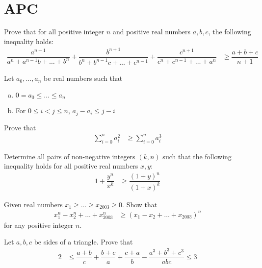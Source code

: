 \documentclass{subfile}
\begin{document}
	\section{APC}\label{sec:apc}
	
		\begin{problem}
			Prove that for all positive integer $n$ and positive real numbers $a,b,c$, the following inequality holds:
				\begin{align*}
					\dfrac{a^{n+1}}{a^{n}+a^{n-1}b+\ldots+b^{n}}+\dfrac{b^{n+1}}{b^{n}+b^{n-1}c+\ldots+c^{n-1}}+\dfrac{c^{n+1}}{c^{n}+c^{n-1}+\ldots+a^{n}}
						& \geq\dfrac{a+b+c}{n+1}
				\end{align*}
		\end{problem}
		
		\begin{problem}
			Let $a_{0},\ldots,a_{n}$ be real numbers such that
				\begin{enumerate}[(a)]
					\item $0= a_{0}\leq\ldots\leq a_{n}$
					\item For $0\leq i<j\leq n$, $a_{j}-a_{i}\leq j-i$
				\end{enumerate}
			Prove that
				\begin{align*}
					\sum_{i=0}^{n}a_{i}^{2}
						& \geq\sum_{i=0}^{n}a_{i}^{3}
				\end{align*}
		\end{problem}
		
		\begin{problem}%
			Determine all pairs of non-negative integers $(k,n)$ such that the following inequality holds for all positive real numbers $x,y$:
				\begin{align*}
					1+\dfrac{y^{n}}{x^{k}}
						& \geq\dfrac{(1+y)^{n}}{(1+x)^{k}}
				\end{align*}
		\end{problem}
		
		\begin{problem}
			Given real numbers $x_{1}\geq\ldots\geq x_{2003}\geq0$. Show that
				\begin{align*}
					x_{1}^{n}-x_{2}^{n}+\ldots+x_{2003}^{n}
						& \geq (x_{1}-x_{2}+\ldots+x_{2003})^{n}
				\end{align*}
			for any positive integer $n$.
		\end{problem}
		
		\begin{problem}
			Let $a,b,c$ be sides of a triangle. Prove that
				\begin{align*}
					2
						& \leq \dfrac{a+b}{c}+\dfrac{b+c}{a}+\dfrac{c+a}{b}-\dfrac{a^{3}+b^{3}+c^{3}}{abc}\leq3
				\end{align*}
		\end{problem}
		
\end{document}
